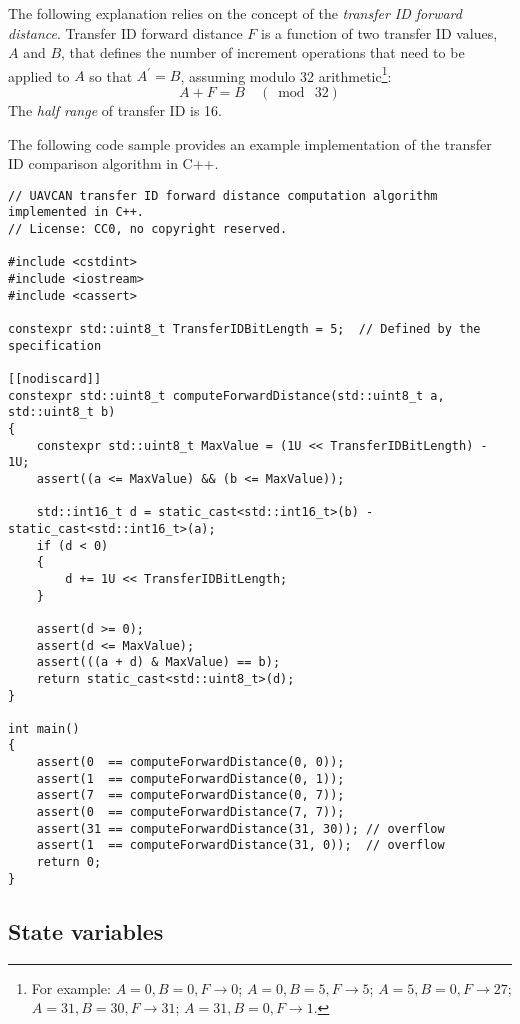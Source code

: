 The following explanation relies on the concept of the \emph{transfer ID forward distance}.
Transfer ID forward distance $F$ is a function of two transfer ID values,
$A$ and $B$, that defines the number of increment operations that need to be applied to
$A$ so that $A^\prime{} = B$, assuming modulo 32 arithmetic\footnote{%
    For example:
    $A=0, B=0, F\rightarrow0$;
    $A=0, B=5, F\rightarrow5$;
    $A=5, B=0, F\rightarrow27$;
    $A=31, B=30, F\rightarrow31$;
    $A=31, B=0, F\rightarrow1$.
}:
$$A + F = B \quad (\bmod{}\ 32)$$
The \emph{half range} of transfer ID is 16.

The following code sample provides an example implementation of the transfer ID comparison algorithm in C++.

\begin{minipage}{0.9\textwidth}  %
\begin{verbatim}
// UAVCAN transfer ID forward distance computation algorithm implemented in C++.
// License: CC0, no copyright reserved.

#include <cstdint>
#include <iostream>
#include <cassert>

constexpr std::uint8_t TransferIDBitLength = 5;  // Defined by the specification

[[nodiscard]]
constexpr std::uint8_t computeForwardDistance(std::uint8_t a, std::uint8_t b)
{
    constexpr std::uint8_t MaxValue = (1U << TransferIDBitLength) - 1U;
    assert((a <= MaxValue) && (b <= MaxValue));

    std::int16_t d = static_cast<std::int16_t>(b) - static_cast<std::int16_t>(a);
    if (d < 0)
    {
        d += 1U << TransferIDBitLength;
    }

    assert(d >= 0);
    assert(d <= MaxValue);
    assert(((a + d) & MaxValue) == b);
    return static_cast<std::uint8_t>(d);
}

int main()
{
    assert(0  == computeForwardDistance(0, 0));
    assert(1  == computeForwardDistance(0, 1));
    assert(7  == computeForwardDistance(0, 7));
    assert(0  == computeForwardDistance(7, 7));
    assert(31 == computeForwardDistance(31, 30)); // overflow
    assert(1  == computeForwardDistance(31, 0));  // overflow
    return 0;
}
\end{verbatim}
\end{minipage}

\subsection{State variables}

